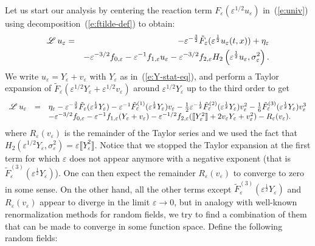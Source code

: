 Let us start our analysis by centering the reaction term $F_{\varepsilon}
(\varepsilon^{1 / 2} u_{\varepsilon})$ in~(\ref{e:univ}) using
decomposition~(\ref{e:ftilde-def}) to obtain:
\begin{eqnarray*}
  \mathscr{L} \hspace{.2em} u_{\varepsilon} & = & - \varepsilon^{- \frac{3}{2}}
  \tilde{F}_{\varepsilon} (\varepsilon^{\frac{1}{2}} u_{\varepsilon} (t, x)) +
  \eta_{\varepsilon}\\
  &  & - \varepsilon^{- 3 / 2} f_{0, \varepsilon} - \varepsilon^{- 1} f_{1,
  \varepsilon} u_{\varepsilon} - \varepsilon^{- 3 / 2} f_{2, \varepsilon} H_2
  \left( \varepsilon^{\frac{1}{2}} u_{\varepsilon}, \sigma_{\varepsilon}^2
  \right) .
\end{eqnarray*}
We write $u_{\varepsilon} = Y_{\varepsilon} + v_{\varepsilon}$ with
$Y_{\varepsilon}$ as in~(\ref{e:Y-stat-eq}), and perform a Taylor expansion of
$\tilde{F}_{\varepsilon} (\varepsilon^{1 / 2} Y_{\varepsilon} + \varepsilon^{1
/ 2} v_{\varepsilon})$ around $\varepsilon^{1 / 2} Y_{\varepsilon}$ up to the
third order to get
\begin{equation}
  \begin{array}{lll}
    \mathscr{L} \hspace{.2em} u_{\varepsilon} & = & \eta_{\varepsilon} - \varepsilon^{- \frac{3}{2}}
    \tilde{F}_{\varepsilon} (\varepsilon^{\frac{1}{2}} Y_{\varepsilon}) -
    \varepsilon^{- 1} \tilde{F}^{(1)}_{\varepsilon} (\varepsilon^{\frac{1}{2}}
    Y_{\varepsilon}) v_{\varepsilon} - \frac{1}{2} \varepsilon^{- \frac{1}{2}}
    \tilde{F}^{(2)}_{\varepsilon} (\varepsilon^{\frac{1}{2}} Y_{\varepsilon})
    v_{\varepsilon}^2 - \frac{1}{6} \tilde{F}^{(3)}_{\varepsilon}
    (\varepsilon^{\frac{1}{2}} Y_{\varepsilon}) v_{\varepsilon}^3\\
    &  & - \varepsilon^{- 3 / 2} f_{0, \varepsilon} - \varepsilon^{- 1} f_{1,
    \varepsilon} (Y_{\varepsilon} + v_{\varepsilon}) - \varepsilon^{- 1 / 2}
    f_{2, \varepsilon} (\llbracket Y_{\varepsilon}^2 \rrbracket + 2
    v_{\varepsilon} Y_{\varepsilon} + v_{\varepsilon}^2) - R_{\varepsilon}
    (v_{\varepsilon}) .
  \end{array} \label{eq:first-exp}
\end{equation}
where $R_{\varepsilon} (v_{\varepsilon})$ is the remainder of the Taylor
series and we used the fact that $H_2 (\varepsilon^{1 / 2} Y_{\varepsilon},
\sigma_{\varepsilon}^2) = \varepsilon \llbracket Y_{\varepsilon}^2
\rrbracket$. Notice that we stopped the Taylor expansion at the first term for
which $\varepsilon$ does not appear anymore with a negative exponent (that is
$\tilde{F}^{(3)}_{\varepsilon} (\varepsilon^{\frac{1}{2}} Y_{\varepsilon})$).
One can then expect the remainder $R_{\varepsilon} (v_{\varepsilon})$ to
converge to zero in some sense. On the other hand, all the other terms except
$\tilde{F}^{(3)}_{\varepsilon} (\varepsilon^{\frac{1}{2}} Y_{\varepsilon})$
and $R_{\varepsilon} (v_{\varepsilon})$ appear to diverge in the limit
$\varepsilon \rightarrow 0$, but in analogy with well-known renormalization
methods for random fields, we try to find a combination of them that can be
made to converge in some function space. Define the following random fields:


